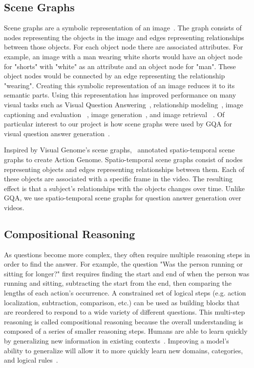 \subsection{Scene Graphs}

Scene graphs are a symbolic representation of an image~\cite{krishna2017visual}. The graph consists of nodes representing the objects in the image and edges representing relationships between those objects. For each object node there are associated attributes. For example, an image with a man wearing white shorts would have an object node for "shorts" with "white" as an attribute and an object node for "man". These object nodes would be connected by an edge representing the relationship "wearing". Creating this symbolic representation of an image reduces it to its semantic parts. Using this representation has improved performance on many visual tasks such as Visual Question Answering~\cite{johnson2017inferring}, relationship modeling~\cite{krishna2018referring}, image captioning and evaluation ~\cite{anderson2016spice}, image generation~\cite{johnson2018image,ashual2019specifying}, and image retrieval ~\cite{ashual2019specifying,johnson2015image}. Of particular interest to our project is how scene graphs were used by GQA for visual question answer generation~\cite{hudson2019gqa}.

Inspired by Visual Genome's scene graphs,~\cite{ji2020action} annotated spatio-temporal scene graphs to create Action Genome. Spatio-temporal scene graphs consist of nodes representing objects and edges representing relationships between them. Each of these objects are associated with a specific frame in the video. The resulting effect is that a subject's relationships with the objects changes over time. Unlike GQA, we use spatio-temporal scene graphs for question answer generation over videos. 

\subsection{Compositional Reasoning}

As questions become more complex, they often require multiple reasoning steps in order to find the answer. For example, the question "Was the person running or sitting for longer?" first requires finding the start and end of when the person was running and sitting, subtracting the start from the end, then comparing the lengths of each action's occurrence. A constrained set of logical steps (e.g. action localization, subtraction, comparison, etc.) can be used as building blocks that are reordered to respond to a wide variety of different questions. This multi-step reasoning is called compositional reasoning because the overall understanding is composed of a series of smaller reasoning steps. Humans are able to learn quickly by generalizing new information in existing contexts~\cite{tani2014self,schulz2016probing}. Improving a model's ability to generalize will allow it to more quickly learn new domains, categories, and logical rules~\cite{lake2018generalization,vatashsky2020vqa}. 


